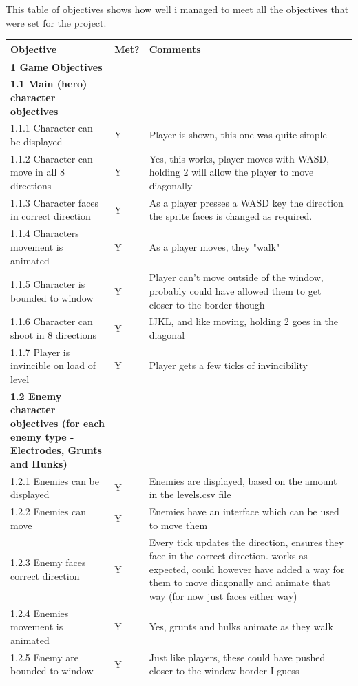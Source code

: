 This table of objectives shows how well i managed to meet all the objectives that were set for the project.
\begin{longtable}{|p{0.3\linewidth}|p{0.1\linewidth}|p{0.6\linewidth}|}
\hline
\rowcolor[HTML]{C0C0C0} 
Objective & Met? & Comments \\ \hline
\endhead
%
{\ul \textbf{1 Game Objectives}} &  &  \\ \hline
\textbf{1.1 Main (hero) character objectives} &  &  \\ \hline
1.1.1 Character can be displayed & Y & Player is shown, this one was quite simple \\ \hline
1.1.2 Character can move in all 8 directions & Y & Yes, this works, player moves with WASD, holding 2 will allow the player to move diagonally \\ \hline
1.1.3 Character faces in correct direction & Y & As a player presses a WASD key the direction the sprite faces is changed as required. \\ \hline
1.1.4 Characters movement is animated & Y & As a player moves, they "walk" \\ \hline
1.1.5 Character is bounded to window & Y & Player can't move outside of the window, probably could have allowed them to get closer to the border though \\ \hline
1.1.6 Character can shoot in 8 directions & Y & IJKL, and like moving, holding 2 goes in the diagonal \\ \hline
1.1.7 Player is invincible on load of level & Y & Player gets a few ticks of invincibility \\ \hline
\textbf{1.2 Enemy character objectives (for each enemy type - Electrodes, Grunts and Hunks)} &  &  \\ \hline
1.2.1 Enemies can be displayed & Y & Enemies are displayed, based on the amount in the levels.csv file \\ \hline
1.2.2 Enemies can move & Y & Enemies have an interface which can be used to move them \\ \hline
1.2.3 Enemy faces correct direction & Y & Every tick updates the direction, ensures they face in the correct direction. works as expected, could however have added a way for them to move diagonally and animate that way (for now just faces either way) \\ \hline
1.2.4 Enemies movement is animated & Y & Yes, grunts and hulks animate as they walk \\ \hline
1.2.5 Enemy are bounded to window & Y & Just like players, these could have pushed closer to the window border I guess \\ \hline

\end{longtable}
